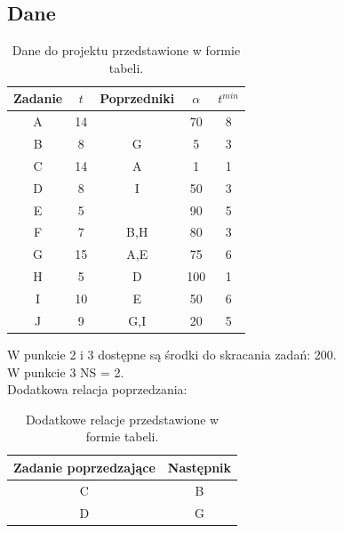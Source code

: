 \documentclass[
    12pt, %
]{../fphw}
\begin{document}
\subsection{Dane}
\begin{table}[H]
    \centering
    \begin{tabular} {| c | c | c | c | c |}
        \hline
        Zadanie & \(t\) & Poprzedniki & \(\alpha\) & \(t^{min}\) \\
        \hline
        A       & 14    &             & 70         & 8           \\
        \hline
        B       & 8     & G           & 5          & 3           \\
        \hline
        C       & 14    & A           & 1          & 1           \\
        \hline
        D       & 8     & I           & 50         & 3           \\
        \hline
        E       & 5     &             & 90         & 5           \\
        \hline
        F       & 7     & B,H         & 80         & 3           \\
        \hline
        G       & 15    & A,E         & 75         & 6           \\
        \hline
        H       & 5     & D           & 100        & 1           \\
        \hline
        I       & 10    & E           & 50         & 6           \\
        \hline
        J       & 9     & G,I         & 20         & 5           \\
        \hline
    \end{tabular}
    \caption{Dane do projektu przedstawione w formie tabeli.}
    \label{tab:dane}
\end{table}
W punkcie 2 i 3 dostępne są środki do skracania zadań: 200. \\
W punkcie 3 NS = 2. \\
Dodatkowa relacja poprzedzania: \\
\begin{table}[H]
    \centering
    \begin{tabular}{| c | c |}
        \hline
        Zadanie poprzedzające & Następnik \\
        \hline
        C                     & B         \\
        \hline
        D                     & G         \\
        \hline
    \end{tabular}
    \caption{Dodatkowe relacje przedstawione w formie tabeli.}
    \label{tab:dod_rel}
\end{table}
\newpage
\end{document}
